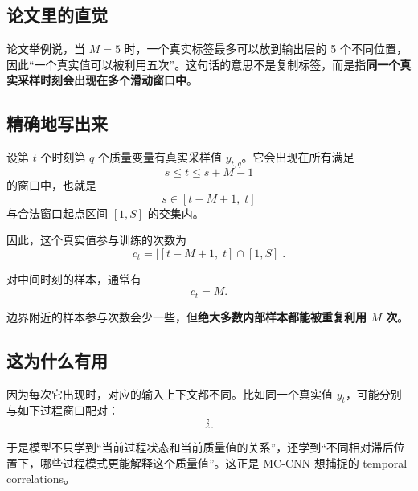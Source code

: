 \documentclass[UTF8]{ctexart}
\begin{document}
\subsection{论文里的直觉}

论文举例说，当 $M=5$ 时，一个真实标签最多可以放到输出层的 5 个不同位置，因此“一个真实值可以被利用五次”。这句话的意思不是复制标签，而是指\textbf{同一个真实采样时刻会出现在多个滑动窗口中}。

\subsection{精确地写出来}

设第 $t$ 个时刻第 $q$ 个质量变量有真实采样值 $y_{t,q}$。它会出现在所有满足
\begin{equation}
    s \le t \le s+M-1
\end{equation}
的窗口中，也就是
\begin{equation}
    s \in [t-M+1,\; t]
\end{equation}
与合法窗口起点区间 $[1,S]$ 的交集内。

因此，这个真实值参与训练的次数为
\begin{equation}
    c_t
    =
    \left|
        [t-M+1,\; t] \cap [1,S]
    \right|.
\end{equation}

对中间时刻的样本，通常有
\begin{equation}
    c_t = M.
\end{equation}

边界附近的样本参与次数会少一些，但\textbf{绝大多数内部样本都能被重复利用 $M$ 次}。

\subsection{这为什么有用}

因为每次它出现时，对应的输入上下文都不同。比如同一个真实值 $y_t$，可能分别与如下过程窗口配对：
\begin{equation}
    [x_{t-4},x_{t-3},x_{t-2},x_{t-1},x_t],
\end{equation}
\begin{equation}
    [x_{t-3},x_{t-2},x_{t-1},x_t,x_{t+1}],
\end{equation}
\begin{equation}
    \dots
\end{equation}

于是模型不只学到“当前过程状态和当前质量值的关系”，还学到“不同相对滞后位置下，哪些过程模式更能解释这个质量值”。这正是 MC-CNN 想捕捉的 temporal correlations。
\end{document}

